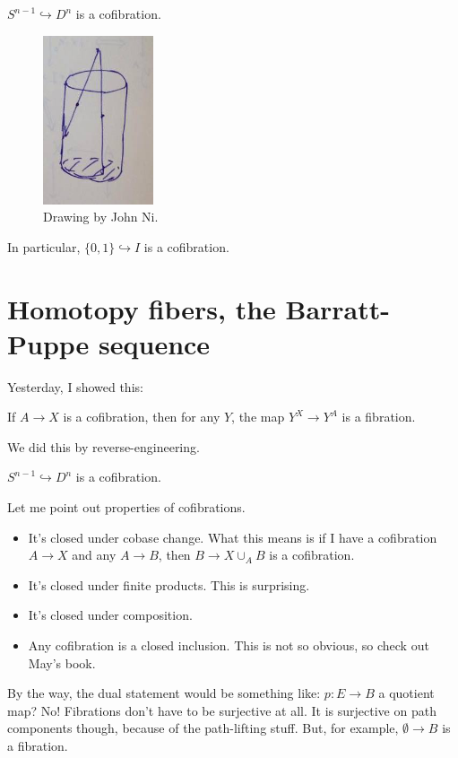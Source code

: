 \begin{example}
    $S^{n-1}\hookrightarrow D^n$ is a cofibration.
    \begin{figure}[H]
	\centering
	\includegraphics[scale=0.75]{retract-cofibration}
	\caption{Drawing by John Ni.}
    \end{figure}
\end{example}
In particular, $\{0,1\}\hookrightarrow I$ is a cofibration.
\chapter{Homotopy fibers, the Barratt-Puppe sequence}
Yesterday, I showed this:
\begin{prop}
    If $A\to X$ is a cofibration, then for any $Y$, the map $Y^X\to Y^A$ is a fibration.
\end{prop}
We did this by reverse-engineering.
\begin{example}
    $S^{n-1}\hookrightarrow D^n$ is a cofibration.
\end{example}
Let me point out properties of cofibrations.
\begin{itemize}
    \item It's closed under cobase change. What this means is if I have a cofibration $A\to X$ and any $A\to B$, then $B\to X\cup_A B$ is a cofibration.
    \item It's closed under finite products. This is surprising.
    \item It's closed under composition.
    \item Any cofibration is a closed inclusion. This is not so obvious, so check out May's book.
\end{itemize}
By the way, the dual statement would be something like: $p:E\to B$ a quotient map? No! Fibrations don't have to be surjective at all. It is surjective on path components though, because of the path-lifting stuff. But, for example, $\emptyset\to B$ is a fibration.

